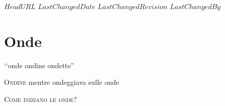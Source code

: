 \svnidlong
{$HeadURL$}
{$LastChangedDate$}
{$LastChangedRevision$}
{$LastChangedBy$}

\chapter{Onde}
\begin{introduction}
	‘‘onde ondine ondette''
	\begin{flushright}
		\textsc{Ondine} mentre ondeggiava sulle onde%
	\end{flushright}
\end{introduction}
\lettrine[findent=1pt, nindent=0pt]{C}{ome iniziano le onde?} 

